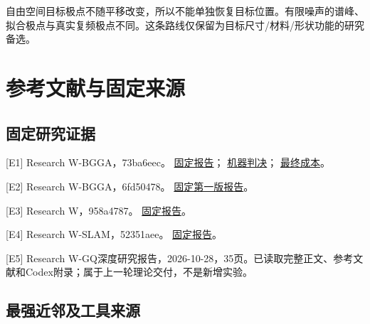 \documentclass[
  10pt,
  a4paper,
]{article}
\begin{document}
自由空间目标极点不随平移改变，所以不能单独恢复目标位置。有限噪声的谱峰、拟合极点与真实复频极点不同。这条路线仅保留为目标尺寸/材料/形状功能的研究备选。

\hypertarget{ux53c2ux8003ux6587ux732eux4e0eux56faux5b9aux6765ux6e90}{%
\section{参考文献与固定来源}\label{ux53c2ux8003ux6587ux732eux4e0eux56faux5b9aux6765ux6e90}}

\hypertarget{ux56faux5b9aux7814ux7a76ux8bc1ux636e}{%
\subsection{固定研究证据}\label{ux56faux5b9aux7814ux7a76ux8bc1ux636e}}

{[}E1{]} Research W-BGGA，73ba6eec。
\href{https://github.com/migodam/b1-probabilistic-maxwell-imaging/blob/73ba6eec3746548bf21259f627b635678709df00/research/research_w_bgga/RESEARCH_W_BGGA_REPORT_ZH.md}{固定报告}；
\href{https://github.com/migodam/b1-probabilistic-maxwell-imaging/blob/73ba6eec3746548bf21259f627b635678709df00/research/research_w_bgga/GATE_DECISION.json}{机器判决}；
\href{https://github.com/migodam/b1-probabilistic-maxwell-imaging/blob/73ba6eec3746548bf21259f627b635678709df00/research/research_w_bgga/COST_SUMMARY.json}{最终成本}。

{[}E2{]} Research W-BGGA，6fd50478。
\href{https://github.com/migodam/b1-probabilistic-maxwell-imaging/blob/6fd504785f4e4be74d919f2363e0b2d1ef111534/research/research_w_bgga/RESEARCH_W_BGGA_REPORT_ZH.md}{固定第一版报告}。

{[}E3{]} Research W，958a4787。
\href{https://github.com/migodam/b1-probabilistic-maxwell-imaging/blob/958a478739d9553269316ded8125fda9df225c0c/research/research_w_p0r_to_p1/RESEARCH_REPORT_ZH.md}{固定报告}。

{[}E4{]} Research W-SLAM，52351aee。
\href{https://github.com/migodam/b1-probabilistic-maxwell-imaging/blob/52351aee6ddd41b09851fe5e52d1a8861891ef13/research/research_w_slam/RESEARCH_W_SLAM_REPORT_ZH.md}{固定报告}。

{[}E5{]} Research
W-GQ深度研究报告，2026-10-28，35页。已读取完整正文、参考文献和Codex附录；属于上一轮理论交付，不是新增实验。

\hypertarget{ux6700ux5f3aux8fd1ux90bbux53caux5de5ux5177ux6765ux6e90}{%
\subsection{最强近邻及工具来源}\label{ux6700ux5f3aux8fd1ux90bbux53caux5de5ux5177ux6765ux6e90}}
\end{document}

